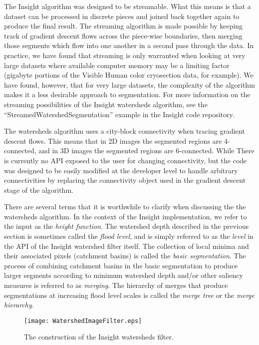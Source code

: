 The Insight algorithm was designed to be streamable.
What this means is that a dataset can be processed in discrete pieces and
joined back together again to produce the final result.  The streaming
algorithm is made possible by keeping track of gradient descent flows across
the piece-wise boundaries, then merging those segments which flow into one
another in a second pass through the data.  In practice, we have found that
streaming is only warranted when looking at very large datasets where available
computer memory may be a limiting factor (gigabyte portions of the Visible
Human color cryosection data, for example).  We have found, however, that for
very large datasets, the complexity of the algorithm makes it a less desirable
approach to segmentation.  For more information on the streaming possibilities
of the Insight watersheds algorithm, see the ``StreamedWatershedSegmentation''
example in the Insight code repository.

The watersheds algorithm uses a city-block connectivity when tracing gradient
descent flows.  This means that in 2D images the segmented regions are
4-connected, and in 3D images the segmented regions are 6-connected.  While
There is currently no API exposed to the user for changing connectivity, but
 the code was designed to be easily modified at the developer level to
handle arbitrary connectivities by replacing the connectivity object used in
the gradient descent stage of the algorithm.

There are several terms that it is worthwhile to clarify when discussing the
the watersheds algorithm.  In the context of the Insight
implementation, we refer to the input as the {\em height function}. The
watershed depth described in the previous section is sometimes called the
{\em flood level}, and is simply referred to as the {\em level} in the API of the
Insight watershed filter itself.  The collection of local minima and their
associated pixels (catchment basins) is called the {\em basic segmentation}.
The process of combining catchment basins in the basic segmentation to produce
larger segments according to minimum watershed depth and/or other saliency
measures is referred to as {\em merging}.  The hierarchy of merges that produce
segmentations at increasing flood level scales is called the {\em merge tree} or
the {\em merge hierarchy}.

\begin{figure}
\centering
\texttt{[image: WatershedImageFilter.eps]}
\caption{The construction of the Insight watersheds filter.}
\protect\label{fig:constructionWatersheds}
\end{figure}

